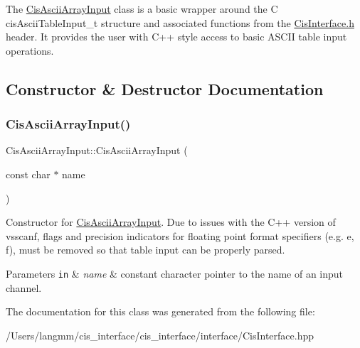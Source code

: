 The \mbox{\hyperlink{classCisAsciiArrayInput}{Cis\+Ascii\+Array\+Input}} class is a basic wrapper around the C cis\+Ascii\+Table\+Input\+\_\+t structure and associated functions from the \mbox{\hyperlink{CisInterface_8h_source}{Cis\+Interface.\+h}} header. It provides the user with C++ style access to basic A\+S\+C\+II table input operations. 

\subsection{Constructor \& Destructor Documentation}
\mbox{\label{classCisAsciiArrayInput_a5b93411bc0df794c6f6a3189d2e02289}} 
\subsubsection{\texorpdfstring{Cis\+Ascii\+Array\+Input()}{CisAsciiArrayInput()}}
{\footnotesize\ttfamily Cis\+Ascii\+Array\+Input\+::\+Cis\+Ascii\+Array\+Input (\begin{DoxyParamCaption}\item[{const char $\ast$}]{name }\end{DoxyParamCaption})\hspace{0.3cm}{\ttfamily [inline]}}



Constructor for \mbox{\hyperlink{classCisAsciiArrayInput}{Cis\+Ascii\+Array\+Input}}. Due to issues with the C++ version of vsscanf, flags and precision indicators for floating point format specifiers (e.\+g. e, f), must be removed so that table input can be properly parsed. 


\begin{DoxyParams}[1]{Parameters}
\mbox{\tt in}  & {\em name} & constant character pointer to the name of an input channel. \\
\hline
\end{DoxyParams}


The documentation for this class was generated from the following file\+:\begin{DoxyCompactItemize}
\item 
/\+Users/langmm/cis\+\_\+interface/cis\+\_\+interface/interface/Cis\+Interface.\+hpp\end{DoxyCompactItemize}
